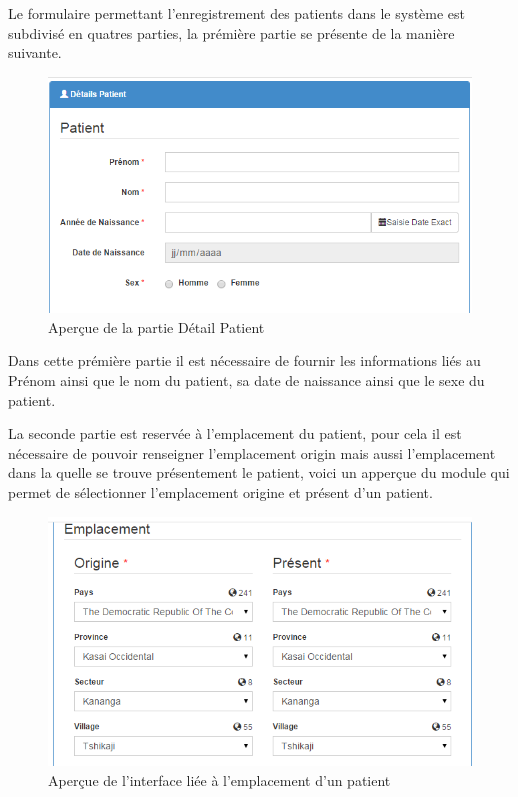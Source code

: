 \documentclass[12pt,a4paper]{report}
\begin{document}
Le formulaire permettant l'enregistrement des patients dans le système est subdivisé en quatres parties, la prémière partie se présente de la manière suivante.

\begin{figure}[h]
\begin{center}
\includegraphics[width=12cm]{pic/DetailPatient.png}
\end{center}
\caption{Aperçue de la partie Détail Patient}
\label{Aperçue de la partie Détail Patient}
\end{figure}

Dans cette prémière partie il est nécessaire de fournir les informations liés au Prénom ainsi que le nom du patient, sa date de naissance ainsi que le sexe du patient.

La seconde partie est reservée à l'emplacement du patient, pour cela il est nécessaire de pouvoir renseigner l'emplacement origin mais aussi l'emplacement dans la quelle se trouve présentement le patient, voici un apperçue du module qui permet de sélectionner l'emplacement origine et présent d'un patient.

\begin{figure}[h]
\begin{center}
\includegraphics[width=12cm]{pic/EmplacementPatient.png}
\end{center}
\caption{Aperçue de l'interface liée à l'emplacement d'un patient}
\label{Aperçue de l'interface liée à l'emplacement d'un patient}
\end{figure}
\end{document}
